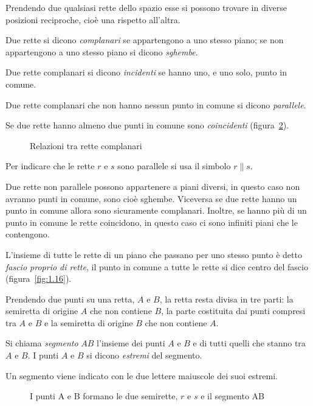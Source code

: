 {Prendendo due qualsiasi rette dello spazio esse si possono trovare in diverse posizioni reciproche, cioè una rispetto all'altra.
\begin{definizione}
Due rette si dicono \emph{complanari} se appartengono a uno stesso piano; se non appartengono a uno stesso piano si dicono \emph{sghembe}.

Due rette complanari si dicono \emph{incidenti} se hanno uno, e uno solo, punto in comune.

Due rette complanari che non hanno nessun punto in comune si dicono \emph{parallele}.

Se due rette hanno almeno due punti in comune sono \emph{coincidenti} (figura~\ref{fig:1.12}).
\end{definizione}
\begin{figure}[b,t,h]
 \centering 
 \caption{Relazioni tra rette complanari}\label{fig:1.12}
\end{figure}
Per indicare che le rette $ r $ e $ s $ sono parallele si usa il simbolo $ r \parallel s $.

\osservazione Due rette non parallele possono appartenere a piani diversi, in questo caso non avranno punti in comune, sono cioè sghembe. Viceversa se due rette hanno un punto in comune allora sono sicuramente complanari. Inoltre, se hanno più di un punto in comune le rette coincidono, in questo caso ci sono infiniti piani che le contengono. 

\begin{definizione}
L'insieme di tutte le rette di un piano che passano per uno stesso punto è detto \emph{fascio proprio di rette}, il punto in comune a tutte le rette si dice centro del fascio (figura~\ref{fig:1.16}).
\end{definizione}

Prendendo due punti su una retta, $ A $ e $ B $, la retta resta divisa in tre parti: la semiretta di origine $ A $ che non contiene $ B $, la parte costituita dai punti compresi tra $ A $ e $ B $ e la semiretta di origine $ B $ che non contiene $ A $.

\begin{definizione}
Si chiama \emph{segmento} $ AB $ l'insieme dei punti $ A $ e $ B $ e di tutti quelli che stanno tra $ A $ e $ B $.
I punti $ A $ e $ B $ si dicono \emph{estremi} del segmento.
\end{definizione}
Un segmento viene indicato con le due lettere maiuscole dei suoi estremi.
\begin{figure}[b,t,h]
 \centering 
 \caption{I punti A e B formano le due semirette, $ r $ e $ s $ e il segmento AB}\label{fig:1.12}
\end{figure}

}

